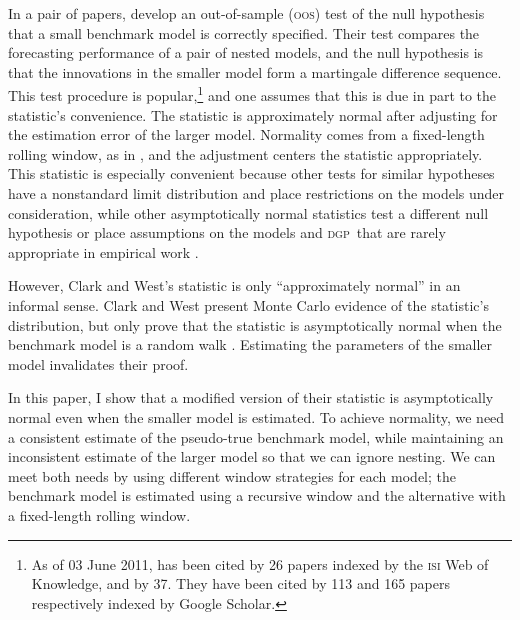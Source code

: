 \documentclass[12pt]{article}
\theoremstyle{definition}
\newcommand{\dgp}{\textsc{dgp}}
\newcommand{\oos}{\textsc{oos}}
\begin{document}
\newpage \noindent In a pair of papers, \citet{ClW:06,ClW:07} develop
an out-of-sample (\oos) test of the null hypothesis that a small
benchmark model is correctly specified.  Their test compares the
forecasting performance of a pair of nested models, and the null
hypothesis is that the innovations in the smaller model form a
martingale difference sequence.  This test procedure is
popular,\footnote{As of 03 June 2011, \citet{ClW:06} has been cited by
  26 papers indexed by the \textsc{isi} Web of Knowledge, and
  \citet{ClW:07} by 37. They have been cited by 113 and 165 papers
  respectively indexed by Google Scholar.} and one assumes that this
is due in part to the statistic's convenience.  The statistic is
approximately normal after adjusting for the estimation error of the
larger model.  Normality comes from a fixed-length rolling window, as
in \citet{GiW:06}, and the adjustment centers the statistic
appropriately.  This statistic is especially convenient because other
tests for similar hypotheses \citep[among
  others]{Mcc:07,ClM:05,ClM:01,CoS:04,CoS:02,CCS:01} have a
nonstandard limit distribution and place restrictions on the models
under consideration, while other asymptotically normal statistics test
a different null hypothesis \citep{GiW:06} or place assumptions on the
models and \dgp\ that are rarely appropriate in empirical work
\citep{Wes:96,WeM:98,Mcc:00,DiM:95}.

However, Clark and West's statistic is only ``approximately normal''
in an informal sense.  Clark and West present Monte Carlo evidence of
the statistic's distribution, but only prove that the statistic is
asymptotically normal when the benchmark model is a random walk
\citep{ClW:06}. Estimating the parameters of the smaller model
invalidates their proof.

In this paper, I show that a modified version of their statistic is
asymptotically normal even when the smaller model is estimated.  To
achieve normality, we need a consistent estimate of the pseudo-true
benchmark model, while maintaining an inconsistent estimate of the
larger model so that we can ignore nesting.  We can meet both needs by
using different window strategies for each model; the benchmark model
is estimated using a recursive window and the alternative with a
fixed-length rolling window.
\end{document}
